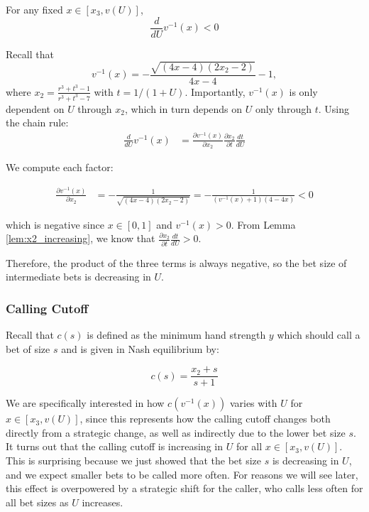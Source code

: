 \documentclass[../../main/main.tex]{subfiles}
\begin{document}
\begin{lemma}
    \label{lem:v_inverse_decreasing}
    For any fixed $x \in [x_3, v(U)]$,
    \[
        \frac{d}{dU} v^{-1}(x) < 0
    \]
\end{lemma}

\begin{customproof}
    Recall that
    $$v^{-1}(x) = -\frac{\sqrt{(4 x-4) (2 x_2-2)}}{4 x-4}-1,$$
    where $x_2 = \frac{r^3 + t^3 - 1}{r^3 + t^3 - 7}$ with $t = 1/(1+U)$. Importantly, $v^{-1}(x)$ is only dependent on $U$ through $x_2$, which in turn depends on $U$ only through $t$. Using the chain rule:
    \begin{align*}
        \frac{d}{dU} v^{-1}(x) & = \frac{\partial v^{-1}(x)}{\partial x_2} \frac{\partial x_2}{\partial t} \frac{dt}{dU}
    \end{align*}

    We compute each factor:

\begin{align*}
    \frac{\partial v^{-1}(x)}{\partial x_2} & = - \frac{1}{\sqrt{(4 x-4) (2 x_2-2)}} = - \frac{1}{(v^{-1}(x)+1)(4-4x)} < 0
\end{align*}

    which is negative since $x \in [0, 1]$ and $v^{-1}(x) >0$. From Lemma \ref{lem:x2_increasing}, we know that $\frac{\partial x_2}{\partial t} \frac{dt}{dU} > 0$.

    Therefore, the product of the three terms is always negative, so the bet size of intermediate bets is decreasing in $U$.
\end{customproof}

\subsubsection{Calling Cutoff}

Recall that $c(s)$ is defined as the minimum hand strength $y$ which should call a bet of size $s$ and is given in Nash equilibrium by:

$$c(s) = \frac{x_2 + s}{s+1}$$

We are specifically interested in how $c(v^{-1}(x))$ varies with $U$ for $x \in [x_3, v(U)]$, since this represents how the calling cutoff changes both directly from a strategic change, as well as indirectly due to the lower bet size $s$. It turns out that the calling cutoff is increasing in $U$ for all $x \in [x_3, v(U)]$. This is surprising because we just showed that the bet size $s$ is decreasing in $U$, and we expect smaller bets to be called more often. For reasons we will see later, this effect is overpowered by a strategic shift for the caller, who calls less often for all bet sizes as $U$ increases.
\end{document}
